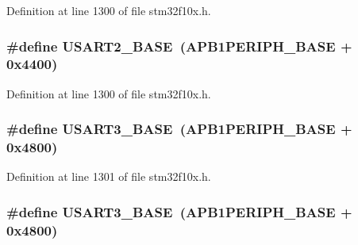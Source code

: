 Definition at line 1300 of file stm32f10x.\+h.

\subsubsection[{\texorpdfstring{U\+S\+A\+R\+T2\+\_\+\+B\+A\+SE}{USART2_BASE}}]{\setlength{\rightskip}{0pt plus 5cm}\#define U\+S\+A\+R\+T2\+\_\+\+B\+A\+SE~({\bf A\+P\+B1\+P\+E\+R\+I\+P\+H\+\_\+\+B\+A\+SE} + 0x4400)}\hypertarget{group___peripheral__memory__map_gade83162a04bca0b15b39018a8e8ec090}{}\label{group___peripheral__memory__map_gade83162a04bca0b15b39018a8e8ec090}


Definition at line 1300 of file stm32f10x.\+h.

\subsubsection[{\texorpdfstring{U\+S\+A\+R\+T3\+\_\+\+B\+A\+SE}{USART3_BASE}}]{\setlength{\rightskip}{0pt plus 5cm}\#define U\+S\+A\+R\+T3\+\_\+\+B\+A\+SE~({\bf A\+P\+B1\+P\+E\+R\+I\+P\+H\+\_\+\+B\+A\+SE} + 0x4800)}\hypertarget{group___peripheral__memory__map_gabe0d6539ac0026d598274ee7f45b0251}{}\label{group___peripheral__memory__map_gabe0d6539ac0026d598274ee7f45b0251}


Definition at line 1301 of file stm32f10x.\+h.

\subsubsection[{\texorpdfstring{U\+S\+A\+R\+T3\+\_\+\+B\+A\+SE}{USART3_BASE}}]{\setlength{\rightskip}{0pt plus 5cm}\#define U\+S\+A\+R\+T3\+\_\+\+B\+A\+SE~({\bf A\+P\+B1\+P\+E\+R\+I\+P\+H\+\_\+\+B\+A\+SE} + 0x4800)}\hypertarget{group___peripheral__memory__map_gabe0d6539ac0026d598274ee7f45b0251}{}\label{group___peripheral__memory__map_gabe0d6539ac0026d598274ee7f45b0251}


